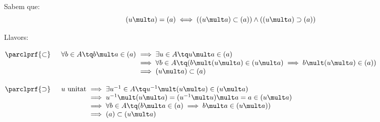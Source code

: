 Sabem que:
\[(u \mult a) = (a) \iff ((u \mult a) \subset (a)) \land ((u \mult a) \supset (a))\]

Llavors:

$\parclprf{\subset} \quad \begin{array}[t]{r@{\ }l}
	\forall b \in A \tq b \mult a \in (a)	& \implies \exists u \in A \tq u \mult a \in (a)  \\
						& \implies \forall b \in A \tq (b \mult (u \mult a) \in (u \mult a) \implies b \mult (u \mult a) \in (a)) \\
						& \implies (u \mult a) \subset (a)
\end{array}$

$\parclprf{\supset} \quad \begin{array}[t]{r@{\ }l}
	u \text{ unitat}	& \implies \exists u^{-1} \in A \tq u^{-1} \mult (u \mult a) \in (u \mult a) \\
				& \implies u^{-1} \mult (u \mult a) = (u^{-1} \mult u) \mult a = a \in (u \mult a) \\
				& \implies \forall b \in A \tq (b \mult a \in (a) \implies b \mult a \in (u \mult a)) \\
				& \implies (a) \subset (u \mult a)
\end{array}$